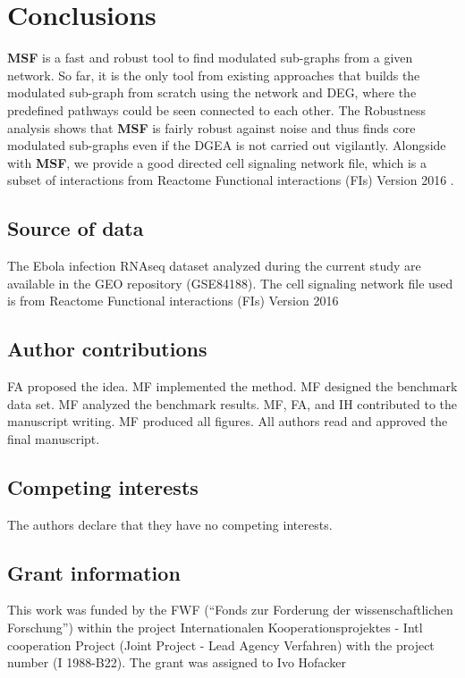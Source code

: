 \documentclass[10pt,a4paper,twocolumn]{article}
\begin{document}
\section*{Conclusions}

\textbf{MSF} is a fast and robust tool to find modulated sub-graphs
from a given network. So far, it is the only tool from existing
approaches that builds the modulated sub-graph from scratch using the
network and DEG, where the predefined pathways could be seen connected
to each other. The Robustness analysis shows that \textbf{MSF} is
fairly robust against noise and thus finds core modulated sub-graphs
even if the DGEA is not carried out vigilantly. Alongside with
\textbf{MSF}, we provide a good directed cell signaling network file,
which is a subset of interactions from Reactome Functional
interactions (FIs) Version 2016 .

\subsection*{Source of data}

The Ebola infection RNAseq dataset analyzed during the current study are
available in the GEO repository (GSE84188). The cell signaling network file
used is from Reactome Functional interactions (FIs) Version 2016


\subsection*{Author contributions}
FA proposed the idea. MF implemented the method. MF designed the benchmark
data set. MF analyzed the benchmark results. MF, FA, and IH contributed to
the manuscript writing. MF produced all figures. All authors read and
approved the final manuscript.

\subsection*{Competing interests}

The authors declare that they have no competing interests.


\subsection*{Grant information}

This work was funded by the FWF (“Fonds zur Forderung der
wissenschaftlichen Forschung”) within the project Internationalen
Kooperationsprojektes - Intl cooperation Project (Joint Project - Lead
Agency Verfahren) with the project number (I 1988-B22). The grant was
assigned to Ivo Hofacker
\end{document}
